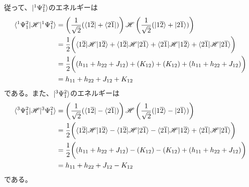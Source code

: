従って、$\ket{^1\Psi_1^2}$のエネルギーは
\begin{align}
	\braket{^1\Psi_1^2|\H|^1\Psi_1^2}
&=
	\left(
		\frac{1}{\sqrt{2}}
		(
			\bra{\aorb{1}\borb{2}}
			+
			\bra{\aorb{2}\borb{1}}
		)
	\right)
	\H
	\left(
		\frac{1}{\sqrt{2}}
		(
			\ket{\aorb{1}\borb{2}}
			+
			\ket{\aorb{2}\borb{1}}
		)
	\right) \\
%
%
&=
	\frac{1}{2}
	\biggl(
		\braket{\aorb{1}\borb{2}|\H|\aorb{1}\borb{2}}
		+
		\braket{\aorb{1}\borb{2}|\H|\aorb{2}\borb{1}}
		+
		\braket{\aorb{2}\borb{1}|\H|\aorb{1}\borb{2}}
		+
		\braket{\aorb{2}\borb{1}|\H|\aorb{2}\borb{1}}
	\biggr) \\
%
%
&=
	\frac{1}{2}
	\biggl(
		(h_{11} +h_{22} +J_{12})
		+
		(K_{12})
		+
		(K_{12})
		+
		(h_{11} +h_{22} +J_{12})
	\biggr) \\
%
%
&=
	h_{11}
	+
	h_{22}
	+
	J_{12}
	+
	K_{12}
\end{align}
である。また、$\ket{^3\Psi_1^2}$のエネルギーは
\begin{align}
	\braket{^3\Psi_1^2|\H|^3\Psi_1^2}
&=
	\left(
		\frac{1}{\sqrt{2}}
		(
			\bra{\aorb{1}\borb{2}}
			-
			\bra{\aorb{2}\borb{1}}
		)
	\right)
	\H
	\left(
		\frac{1}{\sqrt{2}}
		(
			\ket{\aorb{1}\borb{2}}
			-
			\ket{\aorb{2}\borb{1}}
		)
	\right) \\
%
%
&=
	\frac{1}{2}
	\biggl(
		\braket{\aorb{1}\borb{2}|\H|\aorb{1}\borb{2}}
		-
		\braket{\aorb{1}\borb{2}|\H|\aorb{2}\borb{1}}
		-
		\braket{\aorb{2}\borb{1}|\H|\aorb{1}\borb{2}}
		+
		\braket{\aorb{2}\borb{1}|\H|\aorb{2}\borb{1}}
	\biggr) \\
%
%
&=
	\frac{1}{2}
	\biggl(
		(h_{11} +h_{22} +J_{12})
		-
		(K_{12})
		-
		(K_{12})
		+
		(h_{11} +h_{22} +J_{12})
	\biggr) \\
%
%
&=
	h_{11}
	+
	h_{22}
	+
	J_{12}
	-
	K_{12}
\end{align}
である。


